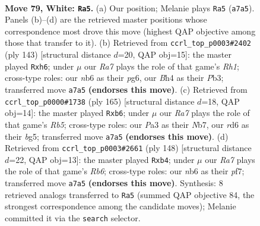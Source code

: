 \documentclass[11pt]{article}
\begin{document}
\clearpage

\begin{figure}[p]\centering
\begin{subfigure}{0.46\textwidth}\centering
\resizebox{\linewidth}{!}{%
\newchessgame
\chessboard[
  setfen={7k/R7/1n1r4/8/p4P1B/P6P/6K1/8 w - - 13 79},
  showmover=false,
  pgfstyle=straightmove, color=movearrow, markmove={a7-a5}
]}
\caption{}
\end{subfigure}\hfill
\begin{subfigure}{0.46\textwidth}\centering
\resizebox{\linewidth}{!}{%
\newchessgame
\chessboard[
  setfen={7r/8/5RPP/8/2pk4/1p4K1/8/8 b - - 0 72},
  showmover=false,
  pgfstyle=straightmove, color=movearrow, markmove={h8-h6}
]}
\caption{}
\end{subfigure}
\\[4pt]
\begin{subfigure}{0.46\textwidth}\centering
\resizebox{\linewidth}{!}{%
\newchessgame
\chessboard[
  setfen={8/1n5p/1P6/3pk1B1/1r6/2R4P/4K3/8 b - - 0 83},
  showmover=false,
  pgfstyle=straightmove, color=movearrow, markmove={b4-b6}
]}
\caption{}
\end{subfigure}\hfill
\begin{subfigure}{0.46\textwidth}\centering
\resizebox{\linewidth}{!}{%
\newchessgame
\chessboard[
  setfen={8/r3kp2/1R6/3P4/1pp1K3/8/5P2/8 w - - 0 75},
  showmover=false,
  pgfstyle=straightmove, color=movearrow, markmove={b6-b4}
]}
\caption{}
\end{subfigure}
\caption{\textbf{Move 79, White: \texttt{Ra5}.} (a) Our position; Melanie plays \texttt{Ra5} (\texttt{a7a5}). Panels (b)--(d) are the retrieved master positions whose correspondence most drove this move (highest QAP objective among those that transfer to it). (b) Retrieved from \texttt{ccrl\_top\_p0003\#2402} (ply 143) [structural distance $d$=20, QAP obj=15]: the master played \texttt{Rxh6}; under $\mu$ our \emph{Ra7} plays the role of that game's \emph{Rh1}; cross-type roles: our \emph{n}b6 as their \emph{p}g6, our \emph{B}h4 as their \emph{P}b3; transferred move \texttt{a7a5} \textbf{(endorses this move)}. (c) Retrieved from \texttt{ccrl\_top\_p0000\#1738} (ply 165) [structural distance $d$=18, QAP obj=14]: the master played \texttt{Rxb6}; under $\mu$ our \emph{Ra7} plays the role of that game's \emph{Rb5}; cross-type roles: our \emph{P}a3 as their \emph{N}b7, our \emph{r}d6 as their \emph{b}g5; transferred move \texttt{a7a5} \textbf{(endorses this move)}. (d) Retrieved from \texttt{ccrl\_top\_p0003\#2661} (ply 148) [structural distance $d$=22, QAP obj=13]: the master played \texttt{Rxb4}; under $\mu$ our \emph{Ra7} plays the role of that game's \emph{Rb6}; cross-type roles: our \emph{n}b6 as their \emph{p}f7; transferred move \texttt{a7a5} \textbf{(endorses this move)}. Synthesis: 8 retrieved analogs transferred to \texttt{Ra5} (summed QAP objective 84, the strongest correspondence among the candidate moves); Melanie committed it via the \texttt{search} selector.}
\label{fig:thought-m156}
\end{figure}
\end{document}
